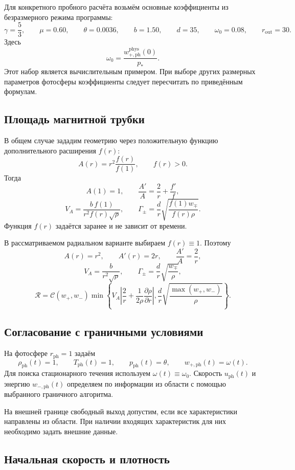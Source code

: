 \documentclass[11pt,a4paper]{article}
\begin{document}
Для конкретного пробного расчёта возьмём основные
коэффициенты из безразмерного режима программы:
\[
\gamma=\frac53,\qquad
\mu=0.60,\qquad
\theta=0.0036,\qquad
b=1.50,\qquad
d=35,\qquad
\omega_0=0.08,\qquad
r_{\mathrm{out}}=30.
\]
Здесь
\[
\omega_0=
\frac{w_{+,\mathrm{ph}}^{\mathrm{phys}}(0)}{p_*}.
\]
Этот набор является вычислительным примером.
При выборе других размерных параметров фотосферы
коэффициенты следует пересчитать по приведённым формулам.

\subsection{Площадь магнитной трубки}

В общем случае зададим геометрию через положительную
функцию дополнительного расширения $f(r)$:
\[
A(r)=r^2\frac{f(r)}{f(1)},
\qquad f(r)>0.
\]
Тогда
\[
A(1)=1,\qquad
\frac{A'}{A}=\frac{2}{r}+\frac{f'}{f},
\]
\[
V_A=\frac{b\,f(1)}{r^2f(r)\sqrt{\rho}},
\qquad
\Gamma_\pm
=\frac{d}{r}
\sqrt{\frac{f(1)w_\mp}{f(r)\rho}}.
\]
Функция $f(r)$ задаётся заранее и не зависит от времени.

В рассматриваемом радиальном варианте выбираем
$f(r)\equiv1$. Поэтому
\[
A(r)=r^2,\qquad
A'(r)=2r,\qquad
\frac{A'}{A}=\frac2r,
\]
\[
V_A=\frac{b}{r^2\sqrt{\rho}},
\qquad
\Gamma_\pm=\frac{d}{r}\sqrt{\frac{w_\mp}{\rho}},
\]
\[
\mathcal R
=
\mathcal C(w_+,w_-)
\min\!\left\{
V_A\left|
\frac2r+\frac{1}{2\rho}\frac{\partial\rho}{\partial r}
\right|,
\frac{d}{r}
\sqrt{\frac{\max(w_+,w_-)}{\rho}}
\right\}.
\]

\subsection{Согласование с граничными условиями}

На фотосфере $r_{\mathrm{ph}}=1$ задаём
\[
\rho_{\mathrm{ph}}(t)=1,\qquad
T_{\mathrm{ph}}(t)=1,\qquad
p_{\mathrm{ph}}(t)=\theta,\qquad
w_{+,\mathrm{ph}}(t)=\omega(t).
\]
Для поиска стационарного течения используем
$\omega(t)\equiv\omega_0$.
Скорость $u_{\mathrm{ph}}(t)$ и энергию
$w_{-,\mathrm{ph}}(t)$ определяем по информации из области
с помощью выбранного граничного алгоритма.

На внешней границе свободный выход допустим,
если все характеристики направлены из области.
При наличии входящих характеристик
для них необходимо задать внешние данные.

\subsection{Начальная скорость и плотность}
\end{document}
